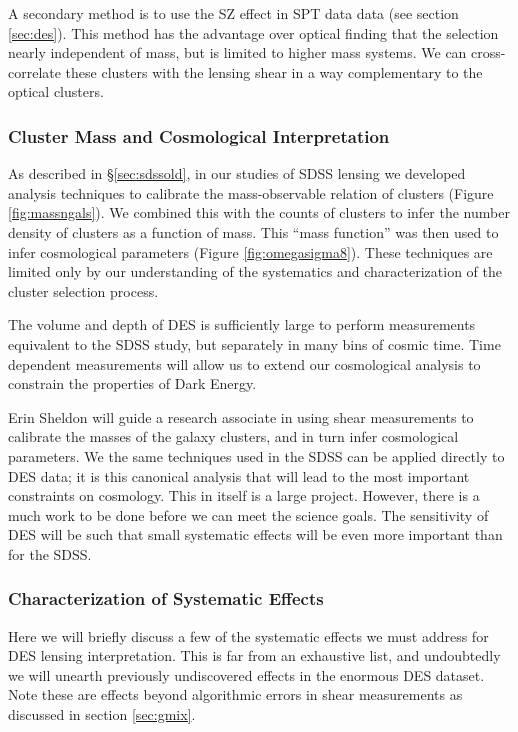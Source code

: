 \documentclass[12pt]{article}
\begin{document}
A secondary method is to use the SZ effect in SPT data data (see section
\ref{sec:des}). This method has the advantage over optical finding that the
selection nearly independent of mass, but is limited to higher mass systems.
We can cross-correlate these clusters with the lensing shear in a way
complementary to the optical clusters.

\subsubsection{Cluster Mass and Cosmological Interpretation}

As described in \S\ref{sec:sdssold}, in our studies of SDSS lensing we
developed analysis techniques to calibrate the mass-observable relation of
clusters (Figure \ref{fig:massngals}).  We combined this with the counts of
clusters to infer the number density of clusters as a function of mass.  This
``mass function'' was then used to infer cosmological parameters (Figure
\ref{fig:omegasigma8}).  These techniques are limited only by our understanding
of the systematics and characterization of the cluster selection process.  

The volume and depth of DES is sufficiently large to perform measurements
equivalent to the SDSS study, but separately in many bins of cosmic time.  Time
dependent measurements will allow us to extend our cosmological analysis to
constrain the properties of Dark Energy.

Erin Sheldon will guide a research associate in using shear measurements to
calibrate the masses of the galaxy clusters, and in turn infer cosmological
parameters.  We the same techniques used in the SDSS can be applied directly to
DES data; it is this canonical analysis that will lead to the most important
constraints on cosmology.  This in itself is a large project.  However, there
is a much work to be done before we can meet the science goals.  The
sensitivity of DES will be such that small systematic effects will be even more
important than for the SDSS.

\subsubsection{Characterization of Systematic Effects}

Here we will briefly discuss a few of the systematic effects we must address
for DES lensing interpretation.  This is far from an exhaustive list, and
undoubtedly we will unearth previously undiscovered effects in the enormous DES
dataset. Note these are effects beyond algorithmic errors in shear measurements
as discussed in section \ref{sec:gmix}.
\end{document}
